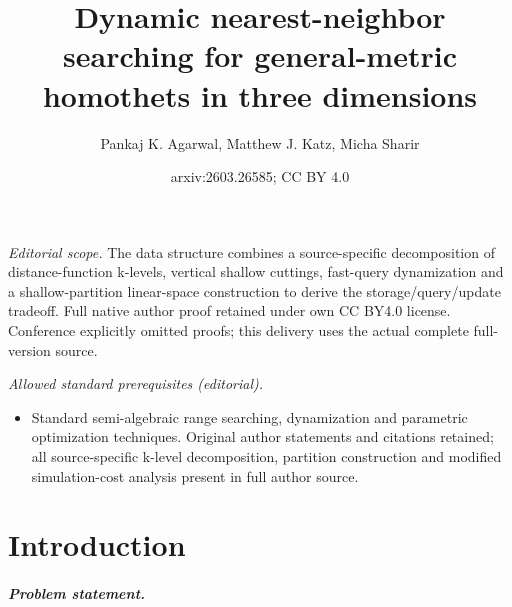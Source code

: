 \documentclass[11pt]{article}
\title{Dynamic nearest-neighbor searching for general-metric homothets in three dimensions}
\author{Pankaj K. Agarwal, Matthew J. Katz, Micha Sharir}
\date{arxiv:2603.26585; CC BY 4.0}
\newif\ifsocgproc
\theoremstyle{definition}
\begin{document}
\maketitle
\noindent\textit{Editorial scope.} The data structure combines a source-specific decomposition of distance-function k-levels, vertical shallow cuttings, fast-query dynamization and a shallow-partition linear-space construction to derive the storage/query/update tradeoff. Full native author proof retained under own CC BY4.0 license. Conference explicitly omitted proofs; this delivery uses the actual complete full-version source.\par\medskip
\noindent\textit{Allowed standard prerequisites (editorial).}\begin{itemize}
\item Standard semi-algebraic range searching, dynamization and parametric optimization techniques. Original author statements and citations retained; all source-specific k-level decomposition, partition construction and modified simulation-cost analysis present in full author source.
\end{itemize}\medskip
\section{Introduction}
\label{sec:intro}
%
\ifsocgproc 
\subparagraph*{Problem statement.}
\else
\end{document}
